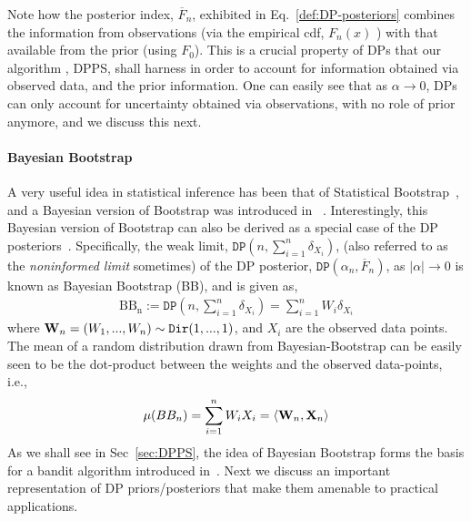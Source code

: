\documentclass[10pt]{article}
\newcommand{\Dir}{\texttt{Dir}}
\newcommand{\DP}{\texttt{DP}}
\begin{document}
Note how the posterior index, $\overline{F}_n$,  exhibited in Eq.~\ref{def:DP-posteriors} combines the information from observations (via the empirical cdf, $F_{n}(x)$ ) with that available from the prior (using $F_{0}$). This is a crucial property of DPs that our algorithm , DPPS, shall harness in order to account for information obtained via  observed data, and the prior information.  One can easily see that as $\alpha \to 0$, DPs can only account for uncertainty obtained via observations, with no role of prior anymore, and we discuss this next. 
\paragraph{Bayesian Bootstrap}  A very useful idea in statistical inference has been that of Statistical Bootstrap~\citep{efron1994introduction}, and a Bayesian version of Bootstrap was introduced in ~\citep{rubin1981bayesian}. Interestingly, this Bayesian version of Bootstrap can also be derived as a special case of the DP posteriors~\citep{ghosal2017fundamentals}. Specifically, the weak limit, $\DP(n,\sum_{i=1}^{n}\delta_{X_{i}})$, (also referred to as the \textit{noninformed limit} sometimes) of the DP posterior, $\DP(\alpha_{n},\overline{F}_n)$, as $|\alpha|\to 0$ is known as Bayesian Bootstrap (BB), and is given as,
\begin{align}\label{def:Bayesian-Bootstrap}
\mathrm{BB_{n}}:= \DP(n,\sum_{i=1}^{n}\delta_{X_{i}}) = \sum_{i=1}^{n} W_{i}\delta_{X_{i}}
\end{align}
where ${\bf W}_n=(W_{1},...,W_{n}) \sim \Dir (1,...,1)$, and $X_{i}$ are the observed data points. The mean of a random distribution drawn from Bayesian-Bootstrap can be easily seen to be the dot-product between the weights and the observed data-points, i.e.,
\begin{align}\label{def: BB-mean}
\mu(BB_{n}) = \sum_{i=1}^{n}W_{i}X_{i} = \left<{\bf W}_n,{\bf X}_n\right>
\end{align}
As we shall see in Sec~\ref{sec:DPPS}, the idea of Bayesian Bootstrap forms the basis for a  bandit algorithm introduced in~\citep{riou2020bandit}. Next we discuss an important representation of DP priors/posteriors that make them amenable to practical applications.
\end{document}
